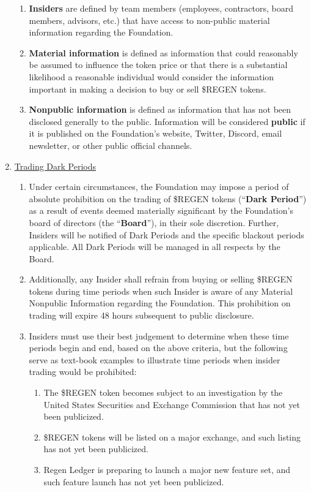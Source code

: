 \documentclass[10pt]{article}
\begin{document}
\begin{enumerate}
\begin{enumerate}
  \item {\bf Insiders} are defined by team members (employees, contractors, board members, advisors, etc.) that have access to non-public material information regarding the Foundation.
  \item {\bf Material information} is defined as information that could reasonably be assumed to influence the token price or that there is a substantial likelihood a reasonable individual would consider the information important in making a decision to buy or sell \$REGEN tokens.
  \item {\bf Nonpublic information} is defined as information that has not been disclosed generally to the public. Information will be considered {\bf public} if it is published on the Foundation’s website, Twitter, Discord, email newsletter, or other public official channels.
	\end{enumerate}
\item \underline{Trading Dark Periods}
	\begin{enumerate}
	\item Under certain circumstances, the Foundation may impose a period of absolute prohibition on the trading of \$REGEN tokens (“{\bf Dark Period}”) as a result of events deemed materially significant by the Foundation’s board of directors (the “{\bf Board}”), in their sole discretion. Further, Insiders will be notified of Dark Periods and the specific blackout periods applicable. All Dark Periods will be managed in all respects by the Board.
	\item Additionally, any Insider shall refrain from buying or selling \$REGEN tokens during time periods when such Insider is aware of any Material Nonpublic Information regarding the Foundation. This prohibition on trading will expire 48 hours subsequent to public disclosure.
	\item Insiders must use their best judgement to determine when these time periods begin and end, based on the above criteria, but the following serve as text-book examples to illustrate time periods when insider trading would be prohibited:
		\begin{enumerate}
		\item The \$REGEN token becomes subject to an investigation by the United States Securities and Exchange Commission that has not yet been publicized.
		\item \$REGEN tokens will be listed on a major exchange, and such listing has not yet been publicized.
		\item Regen Ledger is preparing to launch a major new feature set, and such feature launch has not yet been publicized.

\end{enumerate}
\end{enumerate}
\end{enumerate}
\end{document}
